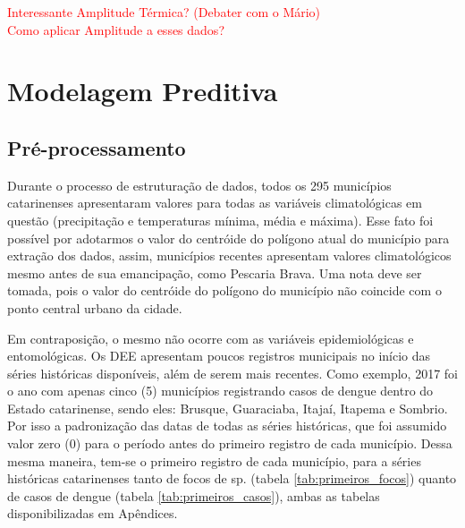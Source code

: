 \documentclass[
	12pt,				%
	openright,			%
	oneside,			%
	a4paper,			%
	english,			%
	french,				%
	spanish,			%
	brazil				%
	dvipsnames, table]{abntex2}
\begin{document}
\indent \textcolor{red}{Interessante Amplitude Térmica? (Debater com o Mário)\\
Como aplicar Amplitude a esses dados?}

\section{Modelagem Preditiva}

\subsection{Pré-processamento}

\indent Durante o processo de estruturação de dados, todos os 295 municípios catarinenses apresentaram valores para todas as variáveis climatológicas em questão (precipitação e temperaturas mínima, média e máxima). Esse fato foi possível por adotarmos o valor do centróide do polígono atual do município para extração dos dados, assim, municípios recentes apresentam valores climatológicos mesmo antes de sua emancipação, como Pescaria Brava. Uma nota deve ser tomada, pois o valor do centróide do polígono do município não coincide com o ponto central urbano da cidade.

\indent Em contraposição, o mesmo não ocorre com as variáveis epidemiológicas e entomológicas. Os \acrshort{DEE} apresentam poucos registros municipais no início das séries históricas disponíveis, além de serem mais recentes. Como exemplo, 2017 foi o ano com apenas cinco (5) municípios registrando casos de dengue dentro do Estado catarinense, sendo eles: Brusque, Guaraciaba, Itajaí, Itapema e Sombrio. Por isso a padronização das datas de todas as séries históricas, que foi assumido valor zero (0) para o período antes do primeiro registro de cada município. Dessa mesma maneira, tem-se o primeiro registro de cada município, para a séries históricas catarinenses tanto de focos de  sp. (tabela \ref{tab:primeiros_focos}) quanto de casos de dengue (tabela \ref{tab:primeiros_casos}), ambas as tabelas disponibilizadas em Apêndices.



\end{document}
